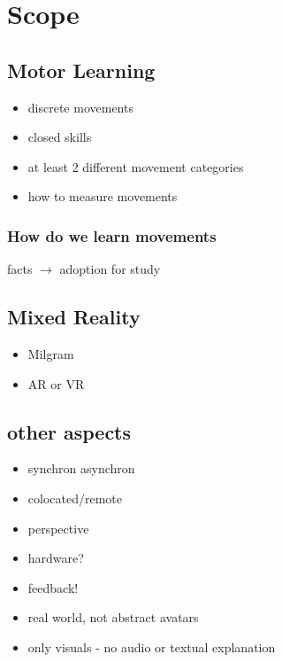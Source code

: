 \chapter{Scope}
\section{Motor Learning}
\begin{itemize}
	\item discrete movements
	\item closed skills
	\item at least 2 different movement categories
	\item how to measure movements
\end{itemize}
\subsection{How do we learn movements}
facts $\rightarrow$ adoption for study
\section{Mixed Reality}
\begin{itemize}
	\item Milgram
	\item AR or VR
\end{itemize}
\section{other aspects}
\begin{itemize}
	\item synchron asynchron
	\item colocated/remote
	\item perspective
	\item hardware?
	\item feedback!
	\item real world, not abstract avatars
	\item only visuals - no audio or textual explanation
\end{itemize}


